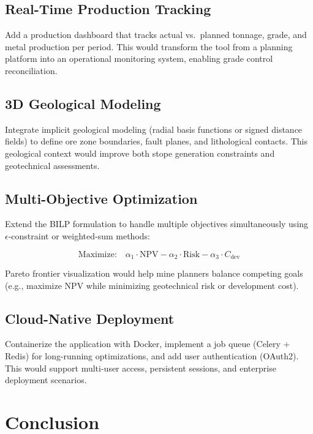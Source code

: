 \documentclass[12pt,a4paper]{article}
\begin{document}
\subsection{Real-Time Production Tracking}
Add a production dashboard that tracks actual vs.\ planned tonnage, grade, and metal production per period. This would transform the tool from a planning platform into an operational monitoring system, enabling grade control reconciliation.

\subsection{3D Geological Modeling}
Integrate implicit geological modeling (radial basis functions or signed distance fields) to define ore zone boundaries, fault planes, and lithological contacts. This geological context would improve both stope generation constraints and geotechnical assessments.

\subsection{Multi-Objective Optimization}
Extend the BILP formulation to handle multiple objectives simultaneously using $\epsilon$-constraint or weighted-sum methods:

\begin{equation}
    \text{Maximize:} \quad \alpha_1 \cdot \text{NPV} - \alpha_2 \cdot \text{Risk} - \alpha_3 \cdot C_{\text{dev}}
\end{equation}

Pareto frontier visualization would help mine planners balance competing goals (e.g., maximize NPV while minimizing geotechnical risk or development cost).

\subsection{Cloud-Native Deployment}
Containerize the application with Docker, implement a job queue (Celery + Redis) for long-running optimizations, and add user authentication (OAuth2). This would support multi-user access, persistent sessions, and enterprise deployment scenarios.

\section{Conclusion}
\label{sec:conclusion}
\end{document}
